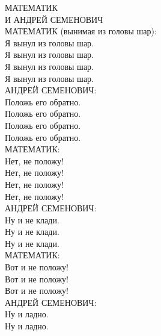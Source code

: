 МАТЕМАТИК \\ 
	И АНДРЕЙ СЕМЕНОВИЧ \\
МАТЕМАТИК (вынимая из головы шар): \\
	\hangindent=1cm Я вынул из головы шар. \\
	\hangindent=1cm Я вынул из головы шар. \\
	\hangindent=1cm Я вынул из головы шар. \\
	\hangindent=1cm Я вынул из головы шар. \\
АНДРЕЙ СЕМЕНОВИЧ: \\
	\hspace{1cm} Положь его обратно. \\
	\hspace{1cm} Положь его обратно. \\
	\hspace{1cm} Положь его обратно. \\
	\hspace{1cm} Положь его обратно. \\
МАТЕМАТИК: \\
	\hspace{1cm} Нет, не положу! \\
	\hspace{1cm} Нет, не положу! \\
	\hspace{1cm} Нет, не положу! \\
	\hspace{1cm} Нет, не положу! \\
АНДРЕЙ СЕМЕНОВИЧ: \\
	\hspace{1cm} Ну и не клади. \\
	\hspace{1cm} Ну и не клади. \\
	\hspace{1cm} Ну и не клади. \\
МАТЕМАТИК: \\
	\hspace{1cm} Вот и не положу! \\
	\hspace{1cm} Вот и не положу! \\
	\hspace{1cm} Вот и не положу! \\
АНДРЕЙ СЕМЕНОВИЧ: \\
	\hspace{1cm} Ну и ладно. \\
	\hspace{1cm} Ну и ладно. \\
